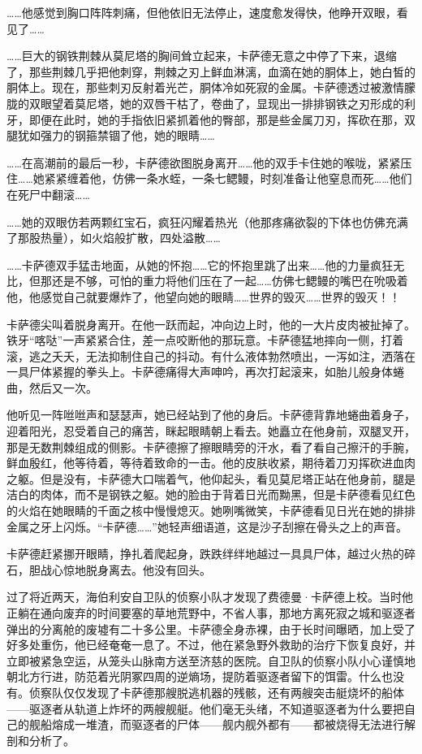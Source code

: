\documentclass[AutoFakeBold=true]{book}
\begin{document}
……他感觉到胸口阵阵刺痛，但他依旧无法停止，速度愈发得快，他睁开双眼，看见了……

……巨大的钢铁荆棘从莫尼塔的胸间耸立起来，卡萨德无意之中停了下来，退缩了，那些荆棘几乎把他刺穿，荆棘之刃上鲜血淋漓，血滴在她的胴体上，她白皙的胴体上。现在，那些刺刃反射着光芒，胴体冷如死寂的金属。卡萨德透过被激情朦胧的双眼望着莫尼塔，她的双唇干枯了，卷曲了，显现出一排排钢铁之刃形成的利牙，即便在此时，她的手指依旧紧抓着他的臀部，那是些金属刀刃，挥砍在那，双腿犹如强力的钢箍禁锢了他，她的眼睛……

……在高潮前的最后一秒，卡萨德欲图脱身离开……他的双手卡住她的喉咙，紧紧压住……她紧紧缠着他，仿佛一条水蛭，一条七鳃鳗，时刻准备让他窒息而死……他们在死尸中翻滚……

……她的双眼仿若两颗红宝石，疯狂闪耀着热光（他那疼痛欲裂的下体也仿佛充满了那股热量），如火焰般扩散，四处溢散……

……卡萨德双手猛击地面，从她的怀抱……它的怀抱里跳了出来……他的力量疯狂无比，但那还是不够，可怕的重力将他们压在了一起……仿佛七鳃鳗的嘴巴在吮吸着他，他感觉自己就要爆炸了，他望向她的眼睛……世界的毁灭……世界的毁灭！！

卡萨德尖叫着脱身离开。在他一跃而起，冲向边上时，他的一大片皮肉被扯掉了。铁牙``喀哒''一声紧紧合住，差一点咬断他的那玩意。卡萨德猛地摔向一侧，打着滚，逃之夭夭，无法抑制住自己的抖动。有什么液体勃然喷出，一泻如注，洒落在一具尸体紧握的拳头上。卡萨德痛得大声呻吟，再次打起滚来，如胎儿般身体蜷曲，然后又一次。

他听见一阵咝咝声和瑟瑟声，她已经站到了他的身后。卡萨德背靠地蜷曲着身子，迎着阳光，忍受着自己的痛苦，眯起眼睛朝上看去。她矗立在他身前，双腿叉开，那是无数荆棘组成的侧影。卡萨德擦了擦眼睛旁的汗水，看了看自己擦汗的手腕，鲜血殷红，他等待着，等待着致命的一击。他的皮肤收紧，期待着刀刃挥砍进血肉之躯。但是没有，卡萨德大口喘着气，他仰起头，看见莫尼塔正站在他身前，腿是洁白的肉体，而不是钢铁之躯。她的脸由于背着日光而黝黑，但是卡萨德看见红色的火焰在她眼睛的千面之核中慢慢熄灭。她咧嘴微笑，卡萨德看见日光在她的排排金属之牙上闪烁。``卡萨德……''她轻声细语道，这是沙子刮擦在骨头之上的声音。

卡萨德赶紧挪开眼睛，挣扎着爬起身，跌跌绊绊地越过一具具尸体，越过火热的碎石，胆战心惊地脱身离去。他没有回头。

\vspace*{1em}

过了将近两天，海伯利安自卫队的侦察小队才发现了费德曼·卡萨德上校。当时他正躺在通向废弃的时间要塞的草地荒野中，不省人事，那地方离死寂之城和驱逐者弹出的分离舱的废墟有二十多公里。卡萨德全身赤裸，由于长时间曝晒，加上受了好多处重伤，他已经奄奄一息了。不过，他在紧急野外救助的治疗下恢复良好，并立即被紧急空运，从笼头山脉南方送至济慈的医院。自卫队的侦察小队小心谨慎地朝北方行进，防范着光阴冢四周的逆熵场，提防着驱逐者留下的饵雷。什么也没有。侦察队仅仅发现了卡萨德那艘脱逃机器的残骸，还有两艘突击艇烧坏的船体——驱逐者从轨道上炸坏的两艘舰艇。他们毫无头绪，不知道驱逐者为什么要把自己的舰船熔成一堆渣，而驱逐者的尸体——舰内舰外都有——都被烧得无法进行解剖和分析了。
\end{document}
